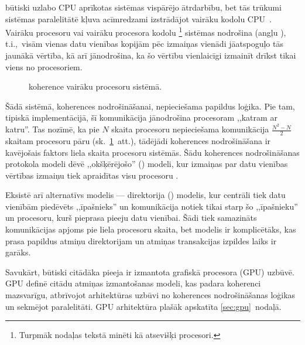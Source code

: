  būtiski uzlabo CPU aprīkotas sistēmas vispārējo
ātrdarbību, bet tās trūkumi sistēmas paralelitātē kļuva acīmredzami
izstrādājot vairāku kodolu CPU~\cite{Fatahalian}\cite{Owens-GPU}\cite{Cache}.
Vairāku procesoru vai vairāku procesora kodolu%
\footnote{Turpmāk nodaļas tekstā minēti kā atsevišķi procesori.}
sistēmas nodrošina
 
(angļu ), t.i.,~visām vienas datu vienības
kopijām  pēc izmaiņas vienādi jāatspoguļo tās
jaunākā vērtība, kā arī jānodrošina, ka šo vērtību vienlaicīgi 
izmainīt drīkst tikai viens no procesoriem.
\begin{figure}[tbh]
	\centering
	\def\svgscale{1.2}
	{}
	\caption{ koherence vairāku procesoru sistēmā.}
	\label{fig:snoop-bottleneck}
\end{figure}
Šādā sistēmā, koherences nodrošināšanai, nepieciešama papildus loģika.
Pie tam, tipiskā implementācijā, šī komunikācija
jānodrošina procesoram ,,katram ar katru''.
Tas nozīmē, ka pie $N$ skaita
procesoru nepieciešama komunikācija $\frac{N^2-N}{2}$ skaitam procesoru pāru
(sk.~\ref{fig:snoop-bottleneck}~att.), tādējādi koherences nodrošināšana ir
kavējošais faktors liela skaita procesoru sistēmās.
Šādu koherences nodrošināšanas protokola modeli dēvē ,,okšķērējošo''
() modeli, kur izmaiņas par datu vienības vērtības izmaiņu
tiek apraidītas visu procesoru .
\cite{Cache}

Eksistē arī alternatīvs modelis --- direktorija () modelis,
kur centrāli tiek  datu vienībām piedēvēts ,,īpašnieks''
un komunikācija notiek tikai starp šo ,,īpašnieku'' un procesoru, kurš
pieprasa pieeju datu vienībai. Šādi tiek samazināts komunikācijas apjoms pie
liela procesoru skaita, bet modelis ir komplicētāks, kas prasa papildus
atmiņu direktorijam un atmiņas transakcijas izpildes laiks ir garāks.
\cite{Cache}

Savukārt, būtiski citādāka pieeja ir izmantota grafiskā procesora (GPU)
uzbūvē. GPU definē citādu atmiņas izmantošanas
modeli, kas padara  koherenci mazsvarīgu,
atbrīvojot arhitektūras uzbūvi no koherences nodrošināšanas loģikas un
sekmējot paralelitāti. GPU arhitektūra plašāk apskatīta \ref{sec:gpu}~nodaļā.




